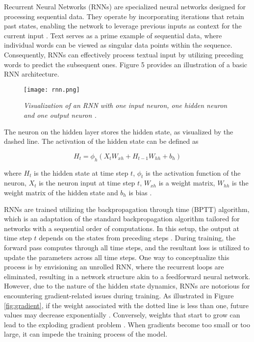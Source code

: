 Recurrent Neural Networks (RNNs) are specialized neural networks designed for processing sequential data. They operate by incorporating iterations that retain past states, enabling the network to leverage previous inputs as context for the current input \cite{schmidt2019recurrent}. Text serves as a prime example of sequential data, where individual words can be viewed as singular data points within the sequence. Consequently, RNNs can effectively process textual input by utilizing preceding words to predict the subsequent ones. Figure 5 provides an illustration of a basic RNN architecture.


\begin{figure}[H]
    \centering
    \texttt{[image: rnn.png]}
    \caption{
        \it{Visualization of an RNN with one input neuron, one hidden neuron and
            one output neuron \cite{lipton2015critical}.}
    }
    \label{fig:rnn}
\end{figure}

The neuron on the hidden layer stores the hidden state, as visualized by the dashed
line. The activation of the hidden state can be defined as

\begin{equation}
    H_t = \phi_h(X_tW_{xh} + H_{t-1}W_{hh} + b_h)
\end{equation}

where \(H_t\) is the hidden state at time step \(t\), \(\phi_t\) is the activation function of the neuron, \(X_t\) is the neuron input at time step \(t\), \(W_{xh}\) is a weight matrix, \(W_{hh}\) is the weight matrix of the hidden state and \(b_h\) is bias \cite{schmidt2019recurrent}.

RNNs are trained utilizing the backpropagation through time (BPTT) algorithm, which is an adaptation of the standard backpropagation algorithm tailored for networks with a sequential order of computations. In this setup, the output at time step \(t\) depends on the states from preceding steps \cite{58337}. During training, the forward pass computes through all time steps, and the resultant loss is utilized to update the parameters across all time steps. One way to conceptualize this process is by envisioning an unrolled RNN, where the recurrent loops are eliminated, resulting in a network structure akin to a feedforward neural network. However, due to the nature of the hidden state dynamics, RNNs are notorious for encountering gradient-related issues during training. As illustrated in Figure \ref{fig:gradient}, if the weight associated with the dotted line is less than one, future values may decrease exponentially \cite{lipton2015critical}. Conversely, weights that start to grow can lead to the exploding gradient problem \cite{schmidt2019recurrent}. When gradients become too small or too large, it can impede the training process of the model.


